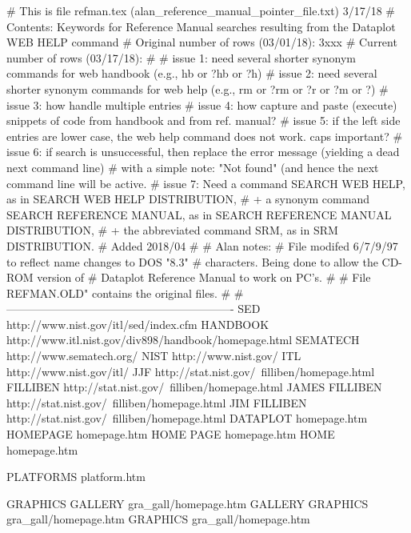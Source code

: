 # This is file refman.tex   (alan_reference_manual_pointer_file.txt)   3/17/18
# Contents: Keywords for Reference Manual searches resulting from the Dataplot     WEB HELP     command
# Original number of rows (03/01/18): 3xxx
# Current  number of rows (03/17/18):
#
# issue 1: need several shorter synonym commands for    web handbook (e.g., hb or ?hb or ?h)
# issue 2: need several shorter synonym commands for    web help     (e.g., rm or ?rm or ?r or ?m or ?)
# issue 3: how handle multiple entries
# issue 4: how capture and paste (execute) snippets of code from handbook and from ref. manual?
# issue 5: if the left side entries are lower case, the web help command does not work.  caps important?
# issue 6: if search is unsuccessful, then replace the error message (yielding a dead next command line)
#          with a simple note: "Not found" (and hence the next command line will be active.
# issue 7: Need a command             SEARCH WEB HELP,         as in SEARCH WEB HELP DISTRIBUTION,
#          + a synonym command        SEARCH REFERENCE MANUAL, as in SEARCH REFERENCE MANUAL DISTRIBUTION,
#          + the abbreviated command  SRM,                     as in SRM DISTRIBUTION.
#          Added 2018/04
#
# Alan notes:
#    File modifed 6/7/9/97 to reflect name changes to DOS "8.3"
#    characters.  Being done to allow the CD-ROM version of
#    Dataplot Reference Manual to work on PC's.
#
#    File REFMAN.OLD" contains the original files.
#
# -------------------------------------------------------------
SED                                     http://www.nist.gov/itl/sed/index.cfm
HANDBOOK                                http://www.itl.nist.gov/div898/handbook/homepage.html
SEMATECH                                http://www.sematech.org/
NIST                                    http://www.nist.gov/
ITL                                     http://www.nist.gov/itl/
JJF                                     http://stat.nist.gov/~filliben/homepage.html
FILLIBEN                                http://stat.nist.gov/~filliben/homepage.html
JAMES FILLIBEN                          http://stat.nist.gov/~filliben/homepage.html
JIM FILLIBEN                            http://stat.nist.gov/~filliben/homepage.html
DATAPLOT                                homepage.htm
HOMEPAGE                                homepage.htm
HOME PAGE                               homepage.htm
HOME                                    homepage.htm

PLATFORMS                               platform.htm

GRAPHICS GALLERY                        gra_gall/homepage.htm
GALLERY GRAPHICS                        gra_gall/homepage.htm
GRAPHICS                                gra_gall/homepage.htm

